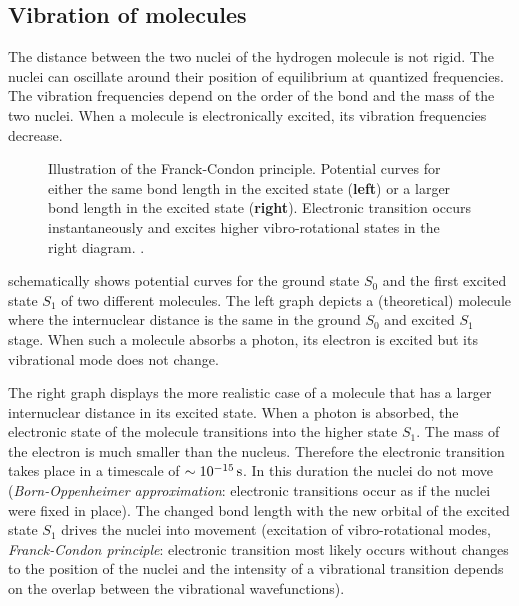 \subsection{Vibration of molecules}
The distance between the two nuclei of the hydrogen molecule is not
rigid. The nuclei can oscillate around their position of equilibrium
at quantized frequencies. The vibration frequencies depend on the
order of the bond and the mass of the two nuclei. When a molecule is
electronically excited, its vibration frequencies decrease.
\begin{figure}[!hbt]
  \centering
  
  \caption{Illustration of the Franck-Condon principle. Potential
    curves for either the same bond length in the
    excited state ({\bf left}) or a larger bond length in the
    excited state ({\bf right}). Electronic transition occurs
    instantaneously and excites higher vibro-rotational states in the
    right diagram. \citep[after][p.~276]{Haken2006}.}
  \label{fig:flu-condon}
\end{figure}

 schematically shows potential curves for the
ground state $S_0$ and the first excited state $S_1$ of two different
molecules. The left graph depicts a (theoretical) molecule where the
internuclear distance is the same in the ground $S_0$ and excited
$S_1$ stage. When such a molecule absorbs a photon, its electron is
excited but its vibrational mode does not change.

The right graph displays the more realistic case of a molecule that
has a larger internuclear distance in its excited state. When a photon
is absorbed, the electronic state of the molecule transitions into the
higher state $S_1$. The mass of the electron is much smaller than the
nucleus. Therefore the electronic transition takes place in a
timescale of $\unit[\sim10^{-15}]{s}$. In this duration the nuclei do
not move (\emph{Born-Oppenheimer approximation}: electronic
transitions occur as if the nuclei were fixed in place). The changed
bond length with the new orbital of the excited state $S_1$ drives the
nuclei into movement (excitation of vibro-rotational modes,
\emph{Franck-Condon principle}: electronic transition most likely
occurs without changes to the position of the nuclei and the intensity
of a vibrational transition depends on the overlap between the
vibrational wavefunctions).

